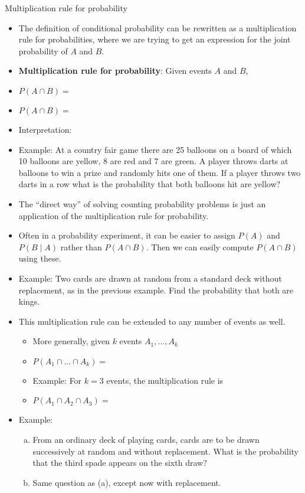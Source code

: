 \documentclass{article}
\newcommand{\vecn}[2]{#1_1, \ldots, #1_{#2}}		%
\begin{document}
Multiplication rule for probability\bigskip
\begin{itemize}
    \item The definition of conditional probability can be rewritten as a multiplication rule for probabilities, where we are trying to get an expression for the joint probability of $A$ and $B$.\vspace{40pt}
    \item \textbf{Multiplication rule for probability}: Given events $A$ and $B$,\bigskip
    \item[] $P(A \cap B) = $\\
    \item[] $P(A \cap B) = $\\
    \item Interpretation:\vspace{50pt}
    \item Example: At a country fair game there are 25 balloons on a board of which 10 balloons are yellow, 8 are red and 7 are green. A player throws darts at balloons to win a prize and randomly hits one of them. If a player throws two darts in a row what is the probability that both balloons hit are yellow?\vspace{140pt}
    \item[] The ``direct way'' of solving counting probability problems is just an application of the multiplication rule for probability.
    \item Often in a probability experiment, it can be easier to assign $P(A)$ and $P(B \mid A)$ rather than $P(A \cap B)$. Then we can easily compute $P(A \cap B)$ using these.
    \item[] Example: Two cards are drawn at random from a standard deck without replacement, as in the previous example. Find the probability that both are kings.\vspace{30pt}
    \item This multiplication rule can be extended to any number of events as well.
    \begin{itemize}
        \item More generally, given $k$ events $\vecn{A}{k}$\bigskip
        \item[] $P(A_1 \cap \dots \cap A_k) = $\bigskip
        \item Example: For $k = 3$ events, the multiplication rule is\bigskip
        \item[] $P(A_1 \cap A_2 \cap A_3) = $
    \end{itemize}\bigskip
    \item Example:
        \begin{enumerate}[(a)]
            \item From an ordinary deck of playing cards, cards are to be drawn successively at random and without replacement. What is the probability that the third spade appears on the sixth draw?\vspace{45pt}
            \item Same question as (a), except now with replacement.\vspace{20pt}
    \end{enumerate}
\end{itemize}\bigskip
\end{document}
